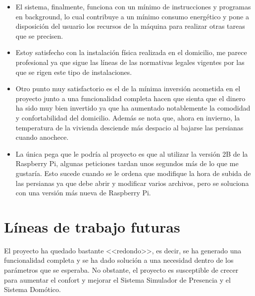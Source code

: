 \begin{itemize}
\item El sistema, finalmente, funciona con un mínimo de instrucciones y programas en background, lo cual contribuye a un mínimo consumo energético y pone a disposición del usuario los recursos de la máquina para realizar otras tareas que se precisen.

\item Estoy satisfecho con la instalación física realizada en el domicilio, me parece profesional ya que sigue las líneas de las normativas legales vigentes por las que se rigen este tipo de instalaciones.

\item Otro punto muy satisfactorio es el de la mínima inversión acometida en el proyecto junto a una funcionalidad completa hacen que sienta que el dinero ha sido muy bien invertido ya que ha aumentado notablemente la comodidad y confortabilidad del domicilio. Además se nota que, ahora en invierno, la temperatura de la vivienda desciende más despacio al bajarse las persianas cuando anochece.

\item La única pega que le podría al proyecto es que al utilizar la versión 2B de la Raspberry Pi, algunas peticiones tardan unos segundos más de lo que me gustaría. Esto sucede cuando se le ordena que modifique la hora de subida de las persianas ya que debe abrir y modificar varios archivos, pero se soluciona con una versión más nueva de Raspberry Pi.

\end{itemize}


\section{Líneas de trabajo futuras}
El proyecto ha quedado bastante <<redondo>>, es decir, se ha generado una funcionalidad completa y se ha dado solución a una necesidad dentro de los parámetros que se esperaba. No obstante, el proyecto es susceptible de crecer para aumentar el confort y mejorar el Sistema Simulador de Presencia y el Sistema Domótico.

